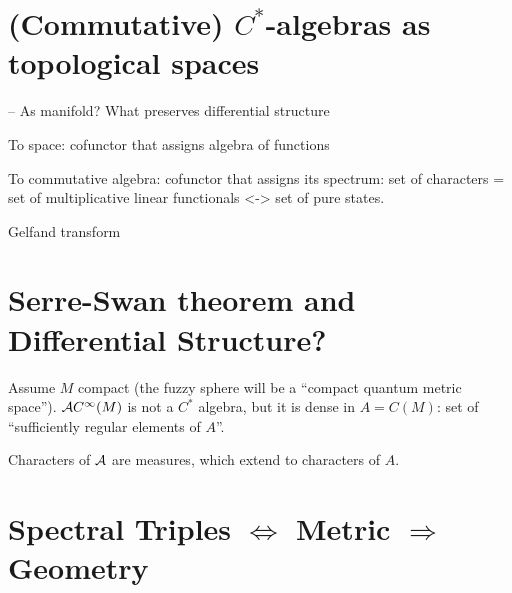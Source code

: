 \linea

\section{(Commutative) $C^*$-algebras as topological spaces}

{ \color{gray}
    -- As manifold? What preserves differential structure
    
    
    To space: cofunctor that assigns algebra of functions
    
    To commutative algebra: cofunctor that assigns its spectrum: set of characters = set of multiplicative linear functionals <-> set of pure states.
    
    Gelfand transform
}

\section{Serre-Swan theorem and Differential Structure?}

{ \color{gray}
    Assume $M$ compact (the fuzzy sphere will be a ``compact quantum metric space''). $\mathcal A C^\infty(M)$ is not a $C^*$ algebra, but it is dense in $A = C(M)$: set of ``sufficiently regular elements of $A$''.
    
    Characters of $\mathcal A$ are measures, which extend to characters of $A$.
}

\section{Spectral Triples $\Longleftrightarrow$ Metric $\Longrightarrow$ Geometry}


